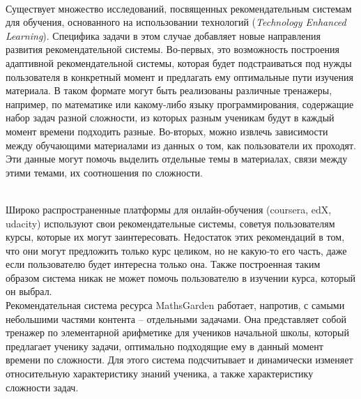 \documentclass[12pt]{article}
\begin{document}
\\\indent Существует множество исследований, посвященных рекомендательным системам для обучения, основанного на использовании технологий (\textit{Technology Enhanced
Learning})\cite{rec_sys_handbook:tel}. Специфика задачи в этом случае добавляет новые направления развития рекомендательной системы. Во-первых, это возможность построения адаптивной рекомендательной системы, которая будет подстраиваться под нужды пользователя в конкретный момент и предлагать ему оптимальные пути изучения материала\cite{adaptive}. В таком формате могут быть реализованы различные тренажеры, например, по математике или какому-либо языку программирования, содержащие набор задач разной сложности, из которых разным ученикам будут в каждый момент времени подходить разные. Во-вторых, можно извлечь зависимости между обучающими материалами из данных о том, как пользователи их проходят. Эти данные могут помочь выделить отдельные темы в материалах, связи между этими темами, их соотношения по сложности\cite{learning_networks}.

\\\indent Широко распространенные платформы для онлайн-обучения (coursera, edX, udacity) используют свои рекомендательные системы, советуя пользователям курсы, которые их могут заинтересовать. Недостаток этих рекомендаций в том, что они могут предложить только курс целиком, но не какую-то его часть, даже если пользователю будет интересна только она. Также построенная таким образом система никак не может помочь пользователю в изучении курса, который он выбрал.
\\\indent Рекомендательная система ресурса MathsGarden\cite{mathsgarden} работает, напротив, с самыми небольшими частями контента -- отдельными задачами. Она представляет собой тренажер по элементарной арифметике для учеников начальной школы, который предлагает ученику задачи, оптимально подходящие ему в данный момент времени по сложности. Для этого система подсчитывает и динамически изменяет относительную характеристику знаний ученика, а также характеристику сложности задач.
\end{document}
